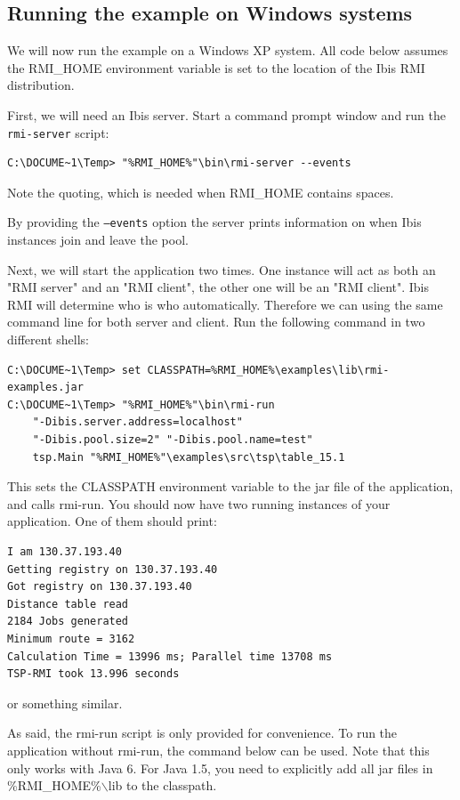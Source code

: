 \documentclass[a4paper,10pt]{article}
\begin{document}
\subsection{Running the example on Windows systems}

We will now run the example on a Windows XP system.
All code below assumes the RMI\_HOME
environment variable is set to the location of the Ibis RMI distribution.

First, we will need an Ibis server. Start a command prompt window and
run the \texttt{rmi-server} script:
\noindent
{\small
\begin{verbatim}
C:\DOCUME~1\Temp> "%RMI_HOME%"\bin\rmi-server --events
\end{verbatim}
}
\noindent

Note the quoting, which is needed when RMI\_HOME contains spaces.

By providing the \texttt{--events} option the server
prints information on when Ibis instances join and leave the pool.

Next, we will start the application two times. One instance will act as both an
"RMI server" and an "RMI client", the other one will be an "RMI client".
Ibis RMI will determine who is who automatically. Therefore we can using the
same command line for both server and client.
Run the following command in two different shells:

\noindent
{\small
\begin{verbatim}
C:\DOCUME~1\Temp> set CLASSPATH=%RMI_HOME%\examples\lib\rmi-examples.jar
C:\DOCUME~1\Temp> "%RMI_HOME%"\bin\rmi-run
    "-Dibis.server.address=localhost"
    "-Dibis.pool.size=2" "-Dibis.pool.name=test"
    tsp.Main "%RMI_HOME%"\examples\src\tsp\table_15.1
\end{verbatim}
}
\noindent

This sets the CLASSPATH environment variable to the jar file of the
application, and calls rmi-run. You should now have two running
instances of your application. One of them should print:

\noindent
{\small
\begin{verbatim}
I am 130.37.193.40
Getting registry on 130.37.193.40
Got registry on 130.37.193.40
Distance table read
2184 Jobs generated
Minimum route = 3162
Calculation Time = 13996 ms; Parallel time 13708 ms
TSP-RMI took 13.996 seconds
\end{verbatim}
}
\noindent

or something similar.

As said, the rmi-run script is only provided for convenience. To run
the application without rmi-run, the command below can be used.
Note that this only works with Java 6. For Java 1.5, you need to
explicitly add all jar files in \%RMI\_HOME\%$\backslash$lib to the classpath.
\end{document}

